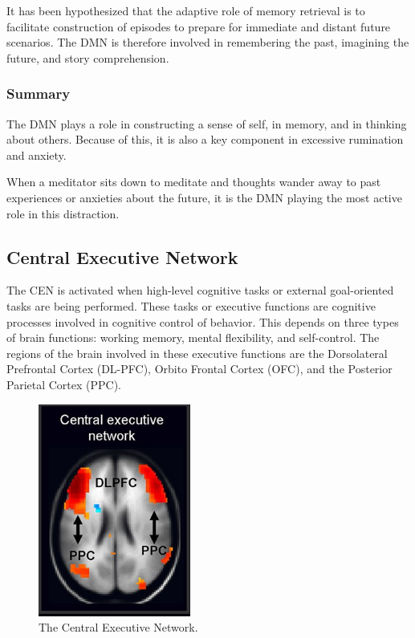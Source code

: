 \documentclass[a4paper, amsfonts, amssymb, amsmath, reprint, showkeys, nofootinbib, twoside]{revtex4-1}
\begin{document}
It has been hypothesized that the adaptive role of memory retrieval is to facilitate
construction of episodes to prepare for immediate and distant future scenarios. \cite{defaultnetworkadaptive}
The DMN is therefore involved in remembering the past, imagining the future, and story
comprehension. \cite{defaultnetworkadaptive}

\subsubsection{Summary}

The DMN plays a role in constructing a sense of self, in memory,
and in thinking about others. Because of this, it is also a key component in excessive
rumination and anxiety. \cite{dmndepression}

When a meditator sits down to meditate and thoughts wander away to past experiences
or anxieties about the future, it is the DMN playing the most active role in this
distraction.


\subsection{Central Executive Network}

The CEN is activated when high-level cognitive tasks or external goal-oriented tasks
are being performed. These tasks or executive functions are cognitive processes involved in
cognitive control of behavior. This depends on three types of brain functions:
working memory, mental flexibility, and self-control. The regions of the brain
involved in these executive functions are the Dorsolateral Prefrontal Cortex
(DL-PFC), Orbito Frontal Cortex (OFC), and the Posterior Parietal Cortex (PPC).

\begin{figure}[H]
  \centering
  \includegraphics[width=5cm]{images/top-cen.jpg}
  \caption{The Central Executive Network.}
  \label{fig:top-cen}
\end{figure}
\end{document}
